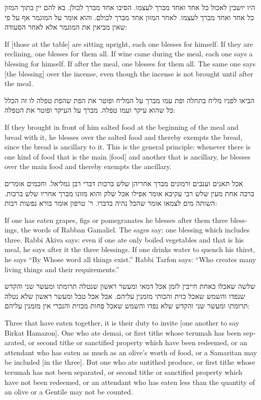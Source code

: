 \documentclass[12pt, openany]{book}
\newcommand{\textblock}[2]{
	{\fontsize{16pt}{20pt}\selectfont #1\\}
	
	\begin{english}
		#2
	\end{english}
	\clearpage
}
\begin{document}
\textblock{היו יושבין לאכול כל אחד ואחד מברך לעצמו. הסיבו אחד מברך לכולן. בא להם יין בתוך המזון כל אחד ואחד מברך לעצמו. לאחר המזון אחד מברך לכולם. והוא אומר על המוגמר אף על פי שאין מביאין את המוגמר אלא לאחר הסעודה: }{If {[those at the table]} are sitting upright, each one blesses for himself. If they are reclining, one blesses for them all. If wine came during the meal, each one says a blessing for himself. If after the meal, one blesses for them all. The same one says {[the blessing]} over the incense, even though the incense is not brought until after the meal.}
\textblock{הביאו לפניו מליח בתחלה ופת עמו מברך על המליח ופוטר את הפת שהפת טפלה לו זה הכלל כל שהוא עיקר ועמו טפלה. מברך על העיקר ופוטר את הטפלה: }{If they brought in front of him salted food at the beginning of the meal and bread with it, he blesses over the salted food and thereby exempts the bread, since the bread is ancillary to it. This is the general principle: whenever there is one kind of food that is the main {[food]} and another that is ancillary, he blesses over the main food and thereby exempts the ancillary.}
\textblock{אכל תאנים וענבים ורמונים מברך אחריהן שלש ברכות דברי רבן גמליאל. וחכמים אומרים ברכה אחת מעין שלש רבי עקיבא אומר אפילו אכל שלק והוא מזונו מברך אחריו שלש ברכות. השותה מים לצמאו אומר שהכל נהיה בדברו. ר' טרפון אומר בורא נפשות רבות: }{If one has eaten grapes, figs or pomegranates he blesses after them three blessings, the words of Rabban Gamaliel. The sages say: one blessing which includes three. Rabbi Akiva says: even if one ate only boiled vegetables and that is his meal, he says after it the three blessings. If one drinks water to quench his thirst, he says “By Whose word all things exist.” Rabbi Tarfon says: “Who creates many living things and their requirements.”}
\textblock{שלשה שאכלו כאחת חייבין לזמן אכל דמאי ומעשר ראשון שנטלה תרומתו ומעשר שני והקדש שנפדו והשמש שאכל כזית והכותי מזמנין עליהם. אבל אכל טבל ומעשר ראשון שלא נטלה תרומתו ומעשר שני והקדש שלא נפדו והשמש שאכל פחות מכזית והנכרי אין מזמנין עליהם: }{Three that have eaten together, it is their duty to invite {[one another to say Birkat Hamazon]}. One who ate demai, or first tithe whose terumah has been separated, or second tithe or sanctified property which have been redeemed, or an attendant who has eaten as much as an olive’s worth of food, or a Samaritan may be included {[in the three]}. But one who ate untithed produce, or first tithe whose terumah has not been separated, or second tithe or sanctified property which have not been redeemed, or an attendant who has eaten less than the quantity of an olive or a Gentile may not be counted.}
\end{document}
